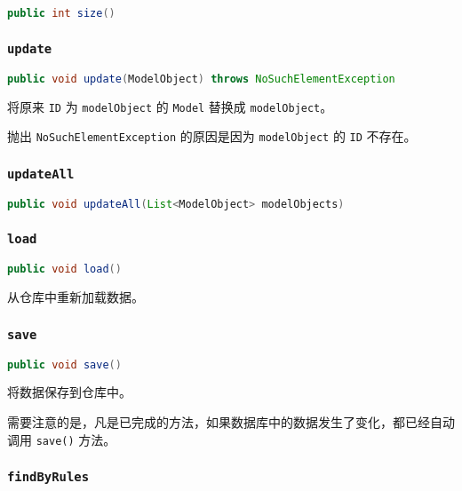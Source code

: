 \documentclass[hyperref,UTF8,12pt,a4paper]{ctexart}
\begin{document}
\begin{lstlisting}[language=Java]
	public int size()
\end{lstlisting}

\subsubsection{\texttt{update}}

\begin{lstlisting}[language=Java]
	public void update(ModelObject) throws NoSuchElementException
\end{lstlisting}

将原来 \texttt{ID} 为 \texttt{modelObject} 的 \texttt{Model} 替换成 \texttt{modelObject}。

抛出 \texttt{NoSuchElementException} 的原因是因为 \texttt{modelObject} 的 \texttt{ID} 不存在。

\subsubsection{\texttt{updateAll}}

\begin{lstlisting}[language=Java]
	public void updateAll(List<ModelObject> modelObjects)
\end{lstlisting}

\subsubsection{\texttt{load}}

\begin{lstlisting}[language=Java]
	public void load()
\end{lstlisting}

从仓库中重新加载数据。

\subsubsection{\texttt{save}}

\begin{lstlisting}[language=Java]
	public void save()
\end{lstlisting}

将数据保存到仓库中。

需要注意的是，凡是已完成的方法，如果数据库中的数据发生了变化，都已经自动调用 \texttt{save()} 方法。

\subsubsection{\texttt{findByRules}}
\end{document}
